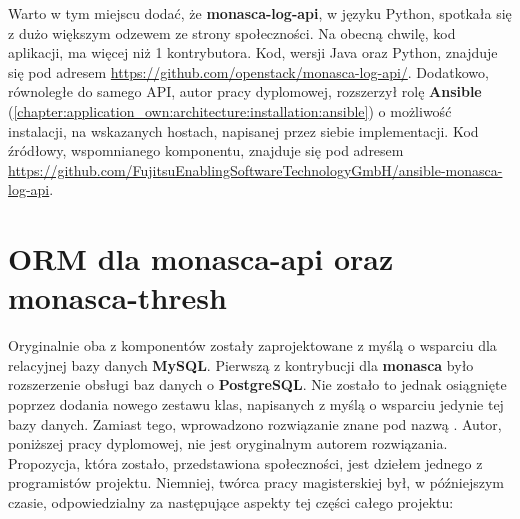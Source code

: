 Warto w tym miejscu dodać, że \textbf{monasca-log-api}, w języku Python, spotkała się z dużo
większym odzewem ze strony społeczności. Na obecną chwilę, kod aplikacji, ma więcej niż 1 kontrybutora.
Kod, wersji Java oraz Python, znajduje się pod adresem \url{https://github.com/openstack/monasca-log-api/}.
Dodatkowo, równoległe do samego API, autor pracy dyplomowej, rozszerzył rolę \textbf{Ansible} (\ref{chapter:application_own:architecture:installation:ansible}) o
możliwość instalacji, na wskazanych hostach, napisanej przez siebie implementacji. Kod źródłowy, wspomnianego komponentu, znajduje się
pod adresem \url{https://github.com/FujitsuEnablingSoftwareTechnologyGmbH/ansible-monasca-log-api}.

\section{ORM dla monasca-api oraz monasca-thresh}
Oryginalnie oba z komponentów zostały zaprojektowane z myślą o wsparciu dla relacyjnej bazy danych \textbf{MySQL}. 
Pierwszą z kontrybucji dla \textbf{monasca} było rozszerzenie obsługi baz danych o \textbf{PostgreSQL}. Nie zostało
to jednak osiągnięte poprzez dodania nowego zestawu klas, napisanych z myślą o wsparciu jedynie tej bazy danych. Zamiast
tego, wprowadzono rozwiązanie znane pod nazwą .
Autor, poniższej pracy dyplomowej, nie jest oryginalnym autorem rozwiązania. Propozycja, która zostało,
przedstawiona społeczności, jest dziełem jednego z programistów projektu. Niemniej, twórca pracy magisterskiej był, w późniejszym czasie,
odpowiedzialny za następujące aspekty tej części całego projektu:

